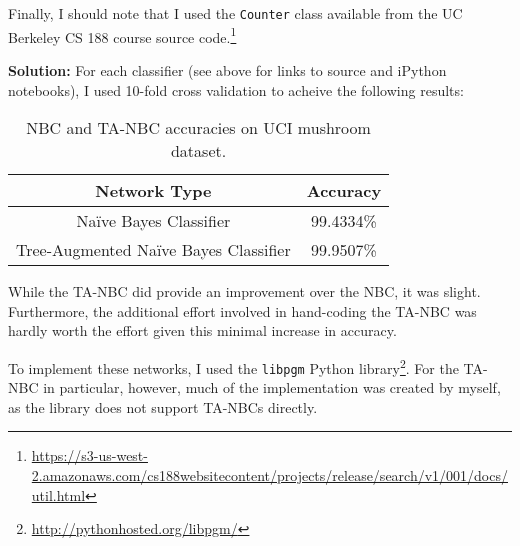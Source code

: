 \documentclass[11pt]{article}
\begin{document}
\begin{enumerate}
Finally, I should note that I used the \verb|Counter| class available from the UC Berkeley CS 188 course source code.\footnote{\url{https://s3-us-west-2.amazonaws.com/cs188websitecontent/projects/release/search/v1/001/docs/util.html}}

\textbf{Solution:} For each classifier (see above for links to source and iPython notebooks), I used 10-fold cross validation to acheive the following results:

\begin{table}[h]
\centering
\begin{tabular}{c|c}
Network Type & Accuracy \\
\hline
Na\"ive Bayes Classifier & 99.4334\% \\
Tree-Augmented Na\"ive Bayes Classifier & 99.9507\% \\
\end{tabular}
\caption{NBC and TA-NBC accuracies on UCI mushroom dataset.}
\label{fig:possible}
\end{table}

While the TA-NBC did provide an improvement over the NBC, it was slight. Furthermore, the additional effort involved in hand-coding the TA-NBC was hardly worth the effort given this minimal increase in accuracy.

To implement these networks, I used the \verb|libpgm| Python library\footnote{\url{http://pythonhosted.org/libpgm/}}. For the TA-NBC in particular, however, much of the implementation was created by myself, as the library does not support TA-NBCs directly.

\end{enumerate}
\end{document}
